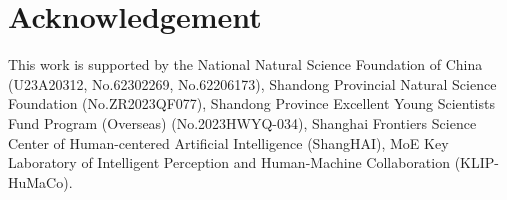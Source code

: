 \documentclass[acmtog]{acmart}
\begin{document}




%

%
%


\section{Acknowledgement}
This work is supported by the National Natural Science Foundation of China (U23A20312, No.62302269, No.62206173), Shandong Provincial Natural Science Foundation (No.ZR2023QF077), Shandong Province Excellent Young Scientists Fund Program (Overseas) (No.2023HWYQ-034), Shanghai Frontiers Science Center of Human-centered Artificial Intelligence (ShangHAI), MoE Key Laboratory of Intelligent Perception and Human-Machine Collaboration (KLIP-HuMaCo).



 



\appendix
\end{document}
